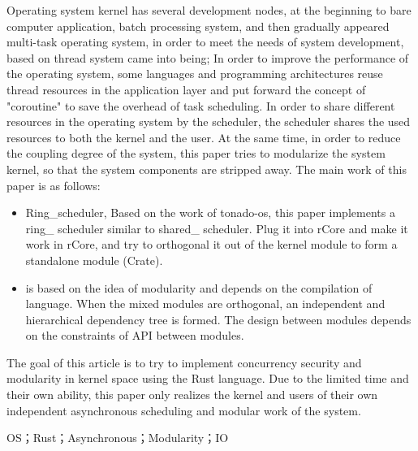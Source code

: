 \begin{spacing}{1.625}
Operating system kernel has several development nodes, at the beginning to bare computer application, batch processing system, and then gradually appeared multi-task operating system, in order to meet the needs of system development, based on thread system came into being; In order to improve the performance of the operating system, some languages and programming architectures reuse thread resources in the application layer and put forward the concept of "coroutine" to save the overhead of task scheduling. In order to share different resources in the operating system by the scheduler, the scheduler shares the used resources to both the kernel and the user. At the same time, in order to reduce the coupling degree of the system, this paper tries to modularize the system kernel, so that the system components are stripped away. The main work of this paper is as follows:

\begin{itemize}
\item Ring\_scheduler, Based on the work of tonado-os, this paper implements a ring\_ scheduler similar to shared\_ scheduler. Plug it into rCore and make it work in rCore, and try to orthogonal it out of the kernel module to form a standalone module (Crate).

\item is based on the idea of modularity and depends on the compilation of language. When the mixed modules are orthogonal, an independent and hierarchical dependency tree is formed. The design between modules depends on the constraints of API between modules.
\end{itemize}

The goal of this article is to try to implement concurrency security and modularity in kernel space using the Rust language. Due to the limited time and their own ability, this paper only realizes the kernel and users of their own independent asynchronous scheduling and modular work of the system.

\keywordsen\quad OS；Rust；Asynchronous；Modularity；IO
\let\cleardoublepage\clearpage
\end{spacing}